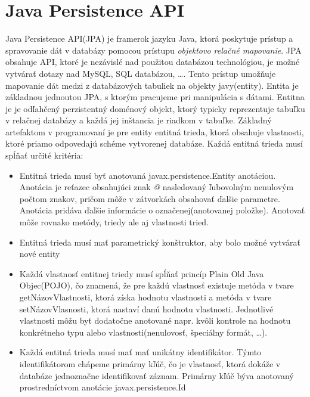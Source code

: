 \section{Java Persistence API}\label{jpakap}
Java Persistence API(JPA) je framerok jazyku Java, ktorá poskytuje prístup a spravovanie dát v databázy pomocou prístupu \emph{objektovo relačné mapovanie}\cite{jpabook}. JPA obsahuje API, ktoré je nezávislé nad použitou databázou technológiou, je možné vytvárať dotazy nad MySQL, SQL databázou, \ldots. Tento prístup  umožňuje mapovanie dát medzi  z databázových tabuliek na objekty javy(entity). Entita je základnou jednoutou JPA, s ktorým pracujeme pri manipulácia s dátami. Entitna je je odľahčený perzistentný doménový objekt, ktorý typicky reprezentuje tabuľku v relačnej databázy a každá jej inštancia je riadkom v  tabuľke. Základný artefaktom v programovaní je pre entity entitná trieda, ktorá obsahuje vlastnosti, ktoré priamo odpovedajú schéme vytvorenej databáze. Každá entitná trieda musí spĺňať určité kritéria:
\begin{itemize}
\item Entitná trieda musí byť anotovaná javax.persistence.Entity anotáciou. Anotácia je reťazec obsahujúci znak \emph{@} nasledovaný ľubovolným nenulovým počtom znakov, pričom môže v zátvorkách obsahovať ďalšie parametre. Anotácia pridáva ďalšie informácie o označenej(anotovanej položke). Anotovať môže rovnako metódy, triedy ale aj vlastnosti tried.
\item Entitná trieda musí mať parametrický konštruktor, aby bolo možné vytvárať nové entity
\item Každá vlastnosť entitnej triedy musí spĺňať princíp Plain Old Java Objec(POJO), čo znamená, že pre každú vlastnosť existuje metóda v tvare getNázovVlastnosti, ktorá získa hodnotu vlastnosti a metóda v tvare setNázovVlasnosti, ktorá nastaví danú hodnotu vlastnosti. Jednotlivé vlastnosti môžu byť dodatočne anotované napr. kvôli kontrole na hodnotu konkrétneho typu alebo vlastnosti(nenulovosť, špeciálny formát, \ldots).
\item Každá entitná trieda musí mať mať unikátny identifikátor. Týmto identifikátorom chápeme primárny kľúč, čo je vlastnosť, ktorá dokáže v databáze jednoznačne identifikovať záznam. Primárny kľúč býva anotovaný prostredníctvom anotácie javax.persistence.Id
\end{itemize}

